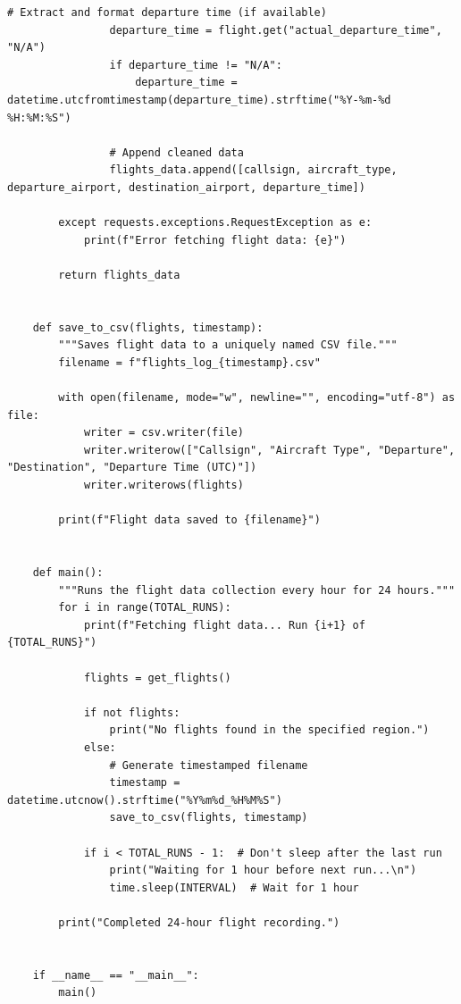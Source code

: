 \documentclass[stu, a4paper, 12pt, floatsintext]{apa7}
\numberwithin{figure}{section}
\numberwithin{table}{section}
\numberwithin{equation}{section}
\begin{document}
\begin{lstlisting}[style=mypython, caption={24-Hour Flight Data Collection using FlightAware API}]
                # Extract and format departure time (if available)
                departure_time = flight.get("actual_departure_time", "N/A")
                if departure_time != "N/A":
                    departure_time = datetime.utcfromtimestamp(departure_time).strftime("%Y-%m-%d %H:%M:%S")
    
                # Append cleaned data
                flights_data.append([callsign, aircraft_type, departure_airport, destination_airport, departure_time])
    
        except requests.exceptions.RequestException as e:
            print(f"Error fetching flight data: {e}")
    
        return flights_data
    
    
    def save_to_csv(flights, timestamp):
        """Saves flight data to a uniquely named CSV file."""
        filename = f"flights_log_{timestamp}.csv"
    
        with open(filename, mode="w", newline="", encoding="utf-8") as file:
            writer = csv.writer(file)
            writer.writerow(["Callsign", "Aircraft Type", "Departure", "Destination", "Departure Time (UTC)"])
            writer.writerows(flights)
    
        print(f"Flight data saved to {filename}")
    
    
    def main():
        """Runs the flight data collection every hour for 24 hours."""
        for i in range(TOTAL_RUNS):
            print(f"Fetching flight data... Run {i+1} of {TOTAL_RUNS}")
    
            flights = get_flights()
    
            if not flights:
                print("No flights found in the specified region.")
            else:
                # Generate timestamped filename
                timestamp = datetime.utcnow().strftime("%Y%m%d_%H%M%S")
                save_to_csv(flights, timestamp)
    
            if i < TOTAL_RUNS - 1:  # Don't sleep after the last run
                print("Waiting for 1 hour before next run...\n")
                time.sleep(INTERVAL)  # Wait for 1 hour
    
        print("Completed 24-hour flight recording.")
    
    
    if __name__ == "__main__":
        main()
    \end{lstlisting}
    
\end{document}
